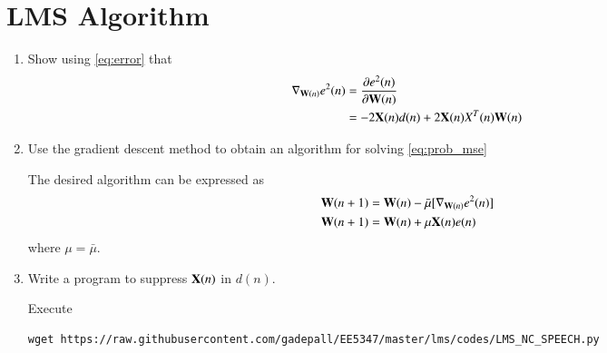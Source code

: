 \documentclass[journal,12pt,twocolumn]{IEEEtran}
\renewcommand\thesection{\arabic{section}}
\begin{document}
\section{LMS Algorithm}
%
\begin{enumerate}[label=\thesection.\arabic*
,ref=\thesection.\theenumi]

%
\item
Show using \eqref{eq:error}  that 
\begin{align}
\nabla_{\mathbf{W}(n)}e^2(n)&=\frac{\partial e^{2}(n)}{\partial \mathbf{W}(n)}\\
&=- 2\mathbf{X}(n)d(n) + 2 \mathbf{X}(n) X^{T}(n)\mathbf{W}(n)
\end{align}
%
\item
Use the gradient descent method to obtain an algorithm for solving \eqref{eq:prob_mse}

\solution The desired algorithm can be expressed as
%
\begin{align}
\mathbf{W}(n+1)&=\mathbf{W}(n) - \bar{\mu}[ \nabla_{\mathbf{W}(n)}e^2(n)]
\\
\mathbf{W}(n+1)&=\mathbf{W}(n)+ \mu \mathbf{X}(n) e(n)
\end{align}
%
where $\mu = \bar{\mu}$.
\item
Write a program to suppress $\mathbf{X}(n)$ in $d(n)$.

\solution Execute 
\begin{lstlisting}
wget https://raw.githubusercontent.com/gadepall/EE5347/master/lms/codes/LMS_NC_SPEECH.py
\end{lstlisting}

\end{enumerate}
\end{document}
